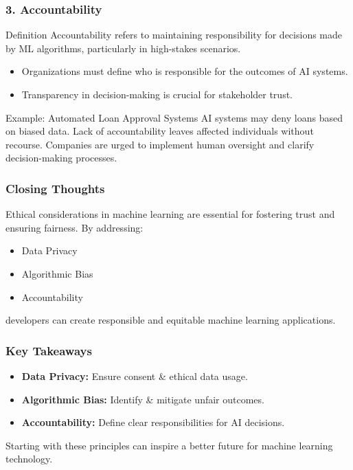 \documentclass[aspectratio=169]{beamer}
\begin{document}
\begin{frame}[fragile]
    \frametitle{3. Accountability}
    \begin{block}{Definition}
        Accountability refers to maintaining responsibility for decisions made by ML algorithms, particularly in high-stakes scenarios.
    \end{block}

    \begin{itemize}
        \item Organizations must define who is responsible for the outcomes of AI systems.
        \item Transparency in decision-making is crucial for stakeholder trust.
    \end{itemize}

    \begin{exampleblock}{Example: Automated Loan Approval Systems}
        AI systems may deny loans based on biased data. Lack of accountability leaves affected individuals without recourse.
        Companies are urged to implement human oversight and clarify decision-making processes.
    \end{exampleblock}
\end{frame}

\begin{frame}[fragile]
    \frametitle{Closing Thoughts}
    Ethical considerations in machine learning are essential for fostering trust and ensuring fairness. By addressing:
    \begin{itemize}
        \item Data Privacy
        \item Algorithmic Bias
        \item Accountability
    \end{itemize}
    developers can create responsible and equitable machine learning applications.
\end{frame}

\begin{frame}[fragile]
    \frametitle{Key Takeaways}
    \begin{itemize}
        \item \textbf{Data Privacy:} Ensure consent & ethical data usage.
        \item \textbf{Algorithmic Bias:} Identify & mitigate unfair outcomes.
        \item \textbf{Accountability:} Define clear responsibilities for AI decisions.
    \end{itemize}
    Starting with these principles can inspire a better future for machine learning technology.
\end{frame}
\end{document}
